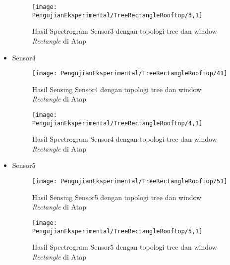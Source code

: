 \begin{itemize}
\begin{figure}[H]
	\centering
	\texttt{[image: PengujianEksperimental/TreeRectangleRooftop/3,1]}
	\caption[Hasil Spectrogram Sensor3 dengan topologi tree dan window {\it Rectangle} di Atap]{Hasil Spectrogram Sensor3 dengan topologi tree dan window {\it Rectangle} di Atap} 
	\label{fig:hasilAtapTreeRect3,1}
\end{figure}

\item Sensor4
\begin{figure}[H]
	\centering
	\texttt{[image: PengujianEksperimental/TreeRectangleRooftop/41]}
	\caption[Hasil Sensing Sensor4 dengan topologi tree dan window {\it Rectangle} di Atap]{Hasil Sensing Sensor4 dengan topologi tree dan window {\it Rectangle} di Atap} 
	\label{fig:hasilAtapTreeRect41}
\end{figure}

\begin{figure}[H]
	\centering
	\texttt{[image: PengujianEksperimental/TreeRectangleRooftop/4,1]}
	\caption[Hasil Spectrogram Sensor4 dengan topologi tree dan window {\it Rectangle} di Atap]{Hasil Spectrogram Sensor4 dengan topologi tree dan window {\it Rectangle} di Atap} 
	\label{fig:hasilAtapTreeRect4,1}
\end{figure}

\item Sensor5
\begin{figure}[H]
	\centering
	\texttt{[image: PengujianEksperimental/TreeRectangleRooftop/51]}
	\caption[Hasil Sensing Sensor5 dengan topologi tree dan window {\it Rectangle} di Atap]{Hasil Sensing Sensor5 dengan topologi tree dan window {\it Rectangle} di Atap} 
	\label{fig:hasilAtapTreeRect51}
\end{figure}

\begin{figure}[H]
	\centering
	\texttt{[image: PengujianEksperimental/TreeRectangleRooftop/5,1]}
	\caption[Hasil Spectrogram Sensor5 dengan topologi tree dan window {\it Rectangle} di Atap]{Hasil Spectrogram Sensor5 dengan topologi tree dan window {\it Rectangle} di Atap} 
	\label{fig:hasilAtapTreeRect5,1}
\end{figure}
\end{itemize}

